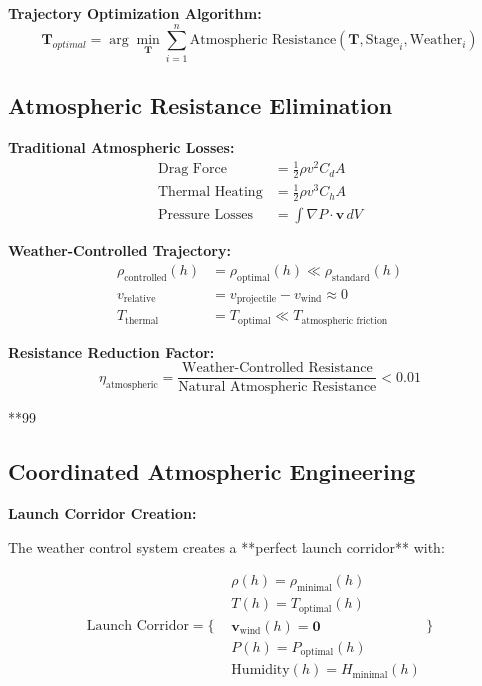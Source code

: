 \documentclass[12pt,a4paper]{article}
\begin{document}
\textbf{Trajectory Optimization Algorithm:}
\begin{equation}
\mathbf{T}_{optimal} = \arg\min_{\mathbf{T}} \sum_{i=1}^{n} \text{Atmospheric Resistance}(\mathbf{T}, \text{Stage}_i, \text{Weather}_i)
\end{equation}

\subsection{Atmospheric Resistance Elimination}

\textbf{Traditional Atmospheric Losses:}
\begin{align}
\text{Drag Force} &= \frac{1}{2}\rho v^2 C_d A \\
\text{Thermal Heating} &= \frac{1}{2}\rho v^3 C_h A \\
\text{Pressure Losses} &= \int \nabla P \cdot \mathbf{v} \, dV
\end{align}

\textbf{Weather-Controlled Trajectory:}
\begin{align}
\rho_{\text{controlled}}(h) &= \rho_{\text{optimal}}(h) \ll \rho_{\text{standard}}(h) \\
v_{\text{relative}} &= v_{\text{projectile}} - v_{\text{wind}} \approx 0 \\
T_{\text{thermal}} &= T_{\text{optimal}} \ll T_{\text{atmospheric friction}}
\end{align}

\textbf{Resistance Reduction Factor:}
\begin{equation}
\eta_{\text{atmospheric}} = \frac{\text{Weather-Controlled Resistance}}{\text{Natural Atmospheric Resistance}} < 0.01
\end{equation}

**99%

\subsection{Coordinated Atmospheric Engineering}

\textbf{Launch Corridor Creation:}

The weather control system creates a **perfect launch corridor** with:

\begin{equation}
\text{Launch Corridor} = \{
\begin{aligned}
&\rho(h) = \rho_{\text{minimal}}(h) \\
&T(h) = T_{\text{optimal}}(h) \\
&\mathbf{v}_{\text{wind}}(h) = \mathbf{0} \\
&P(h) = P_{\text{optimal}}(h) \\
&\text{Humidity}(h) = H_{\text{minimal}}(h)
\end{aligned}
\}
\end{equation}
\end{document}

